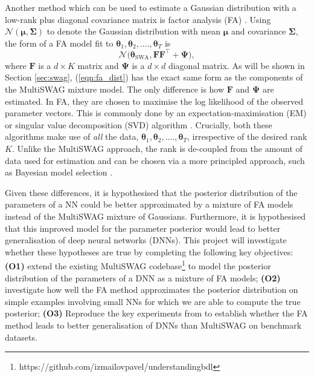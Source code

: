 \documentclass[a4paper,11pt]{article}
\newcommand{\matr}[1]{\mathbf{#1}}
\newcommand{\bgreek}[1]{\boldsymbol{#1}}
\begin{document}
Another method which can be used to estimate a Gaussian distribution with a low-rank plus diagonal covariance matrix is factor analysis (FA) \cite{barber2007}.  Using $\mathcal{N}(\bgreek{\mu}, \matr{\Sigma})$ to denote the Gaussian distribution with mean $\bgreek{\mu}$ and covariance $\matr{\Sigma}$, the form of a FA model fit to $\bgreek{\theta}_1, \bgreek{\theta}_2, ...., \bgreek{\theta}_T$ is 
\begin{equation}\label{eqn:fa_dist}
	\mathcal{N}\Big(\bgreek{\theta}_{\text{SWA}}, \matr{FF}^{\intercal} + \matr{\Psi} \Big),
\end{equation}
where $\matr{F}$ is a $d \times K$ matrix and $\matr{\Psi}$ is a $d \times d$ diagonal matrix. As will be shown in Section \ref{sec:swag}, (\ref{eqn:fa_dist})
has the exact same form as the components of the MultiSWAG mixture model. The only difference is how $\matr{F}$ and $\matr{\Psi}$ are estimated. In
FA, they are chosen to maximise the log likelihood of the observed parameter vectors. This is commonly done by an expectation-maximisation (EM) or
singular value decomposition (SVD) algorithm \cite{barber2007}. Crucially, both these algorithms make use of \emph{all} the data, $\bgreek{\theta}_1,
\bgreek{\theta}_2, ...., \bgreek{\theta}_T$, irrespective of the desired rank $K$. Unlike the MultiSWAG approach, the rank is de-coupled from the amount of data used for estimation and can be chosen via a more principled approach, such as Bayesian model selection
\cite{barber2007}.

Given these differences, it is hypothesised that the posterior distribution of the parameters of a NN could be better approximated by a mixture of FA models instead of the MultiSWAG mixture of Gaussians. Furthermore, it is hypothesised that this improved model for the parameter posterior would lead to better generalisation of deep neural networks (DNNs). This project will investigate whether these hypotheses are true by completing the following key objectives: \textbf{(O1)} extend the existing MultiSWAG codebase\footnote{https://github.com/izmailovpavel/understandingbdl} to model the posterior distribution of the parameters of a DNN as a mixture of FA models; \textbf{(O2)} investigate how well the FA method approximates the posterior distribution on simple examples involving small NNs for which we are able to compute the true posterior; \textbf{(O3)} Reproduce the key experiments from \cite{izmailov2020} to establish whether the FA method leads to better generalisation of DNNs than MultiSWAG on benchmark datasets.
\end{document}
